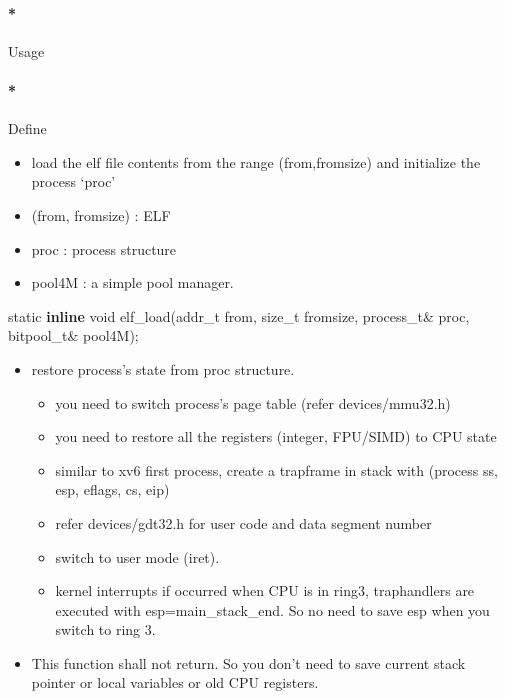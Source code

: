 \documentclass[]{article}
\newenvironment{Shaded}{}{}
\newcommand{\KeywordTok}[1]{\textbf{{#1}}}
\newcommand{\DataTypeTok}[1]{\textcolor[rgb]{0.50,0.00,0.00}{{#1}}}
\newcommand{\NormalTok}[1]{{#1}}
\providecommand{\tightlist}{%
  \setlength{\itemsep}{0pt}\setlength{\parskip}{0pt}}
\let\oldparagraph\paragraph
\renewcommand{\paragraph}[1]{\oldparagraph{#1}\mbox{}}
\begin{document}
\paragraph*{Usage}\label{usage-9}

\paragraph*{Define}\label{define-9}

\begin{itemize}
\tightlist
\item
  load the elf file contents from the range (from,fromsize) and
  initialize the process `proc'
\item
  (from, fromsize) : ELF
\item
  proc : process structure
\item
  pool4M : a simple pool manager.
\end{itemize}

\begin{Shaded}
\begin{Highlighting}[]
\DataTypeTok{static} \KeywordTok{inline} \DataTypeTok{void} \NormalTok{elf_load(addr_t from, }\DataTypeTok{size_t} \NormalTok{fromsize, process_t& proc, bitpool_t& pool4M);}
\end{Highlighting}
\end{Shaded}

\begin{itemize}
\tightlist
\item
  restore process's state from proc structure.

  \begin{itemize}
  \tightlist
  \item
    you need to switch process's page table (refer devices/mmu32.h)
  \item
    you need to restore all the registers (integer, FPU/SIMD) to CPU
    state
  \item
    similar to xv6 first process, create a trapframe in stack with
    (process ss, esp, eflags, cs, eip)
  \item
    refer devices/gdt32.h for user code and data segment number
  \item
    switch to user mode (iret).
  \item
    kernel interrupts if occurred when CPU is in ring3, traphandlers are
    executed with esp=main\_stack\_end. So no need to save esp when you
    switch to ring 3.
  \end{itemize}
\item
  This function shall not return. So you don't need to save current
  stack pointer or local variables or old CPU registers.
\end{itemize}
\end{document}
